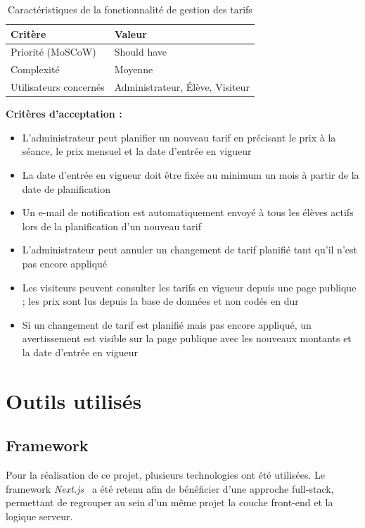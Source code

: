 \documentclass{article}
\begin{document}
\begin{table}[H]
\centering
\begin{tabular}{|p{5cm}|p{7cm}|}
\hline
\textbf{Critère} & \textbf{Valeur} \\
\hline
Priorité (MoSCoW) & Should have \\
\hline
Complexité & Moyenne \\
\hline
Utilisateurs concernés & Administrateur, Élève, Visiteur \\
\hline
\end{tabular}
\caption{Caractéristiques de la fonctionnalité de gestion des tarifs}
\end{table}

\textbf{Critères d'acceptation :}
\begin{itemize}
    \item L'administrateur peut planifier un nouveau tarif en
    précisant le prix à la séance, le prix mensuel et la date
    d'entrée en vigueur
    \item La date d'entrée en vigueur doit être fixée au minimum
    un mois à partir de la date de planification
    \item Un e-mail de notification est automatiquement envoyé
    à tous les élèves actifs lors de la planification d'un
    nouveau tarif
    \item L'administrateur peut annuler un changement de tarif
    planifié tant qu'il n'est pas encore appliqué
    \item Les visiteurs peuvent consulter les tarifs en vigueur
    depuis une page publique ; les prix sont lus depuis la base
    de données et non codés en dur
    \item Si un changement de tarif est planifié mais pas encore
    appliqué, un avertissement est visible sur la page publique
    avec les nouveaux montants et la date d'entrée en vigueur
\end{itemize}

\section{Outils utilisés}

\subsection{Framework}

Pour la réalisation de ce projet, plusieurs technologies ont été utilisées. 
Le framework \textit{Next.js}~\cite{nextjs} a été retenu afin de bénéficier d'une approche 
full-stack, permettant de regrouper au sein d'un même projet la couche 
front-end et la logique serveur.
\end{document}
